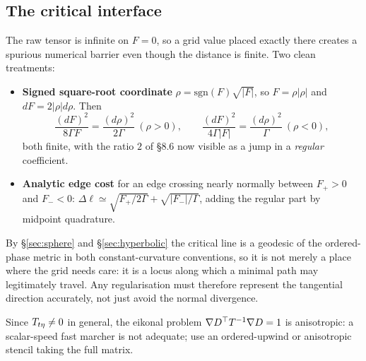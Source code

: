 \subsection{The critical interface}
The raw tensor is infinite on $F=0$, so a grid value placed exactly there creates a spurious
numerical barrier even though the distance is finite. Two clean treatments:
\begin{itemize}
  \item \textbf{Signed square-root coordinate} $\rho=\mathrm{sgn}(F)\sqrt{|F|}$, so
        $F=\rho|\rho|$ and $dF=2|\rho|d\rho$. Then
        \begin{equation}
          \frac{(dF)^{2}}{8\Gamma F}=\frac{(d\rho)^{2}}{2\Gamma}\ (\rho>0),
          \qquad
          \frac{(dF)^{2}}{4\Gamma|F|}=\frac{(d\rho)^{2}}{\Gamma}\ (\rho<0),
        \end{equation}
        both finite, with the ratio $2$ of \S8.6 now visible as a jump in a \emph{regular}
        coefficient.
  \item \textbf{Analytic edge cost} for an edge crossing nearly normally between $F_+>0$ and
        $F_-<0$:
        $\Delta\ell\simeq\sqrt{F_+/2\Gamma}+\sqrt{|F_-|/\Gamma}$, adding the regular part by
        midpoint quadrature.
\end{itemize}
 By \S\ref{sec:sphere} and
\S\ref{sec:hyperbolic} the critical line is a geodesic of the ordered-phase metric in both
constant-curvature conventions, so it is not merely a place where the grid needs care:
it is a locus along which a minimal path may legitimately travel. Any regularisation must
therefore represent the tangential direction accurately, not just avoid the normal
divergence.

Since $T_{t\eta}\neq0$ in general, the eikonal problem
$\nabla D^{\top}T^{-1}\nabla D=1$ is anisotropic: a scalar-speed fast marcher is not
adequate; use an ordered-upwind or anisotropic stencil taking the full matrix.

